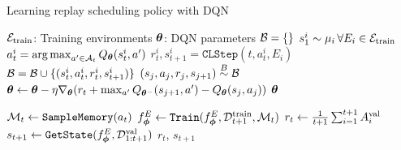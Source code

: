 \begin{algorithm}[t]
	\caption{Learning replay scheduling policy with DQN}
	\label{alg:learning_replay_scheduling_policy_with_dqn}
	\begin{algorithmic}[1]
		\Require ${\mathcal{E}}_{{\text{train}}}$: Training environments
		\Require ${\bm{\theta}}$: DQN parameters
		\State ${\mathcal{B}} = \{\}$ 
		\State $s_1^{i} \sim \mu_i \, \forall E_i \in {\mathcal{E}}_{{\text{train}}}$ 
		\State $a_t^{i} = \operatorname*{arg\,max}_{a' \in {\mathcal{A}}_t} Q_{{\bm{\theta}}}(s_t^{i}, a')$ 
		\State $r_t^{i}, s_{t+1}^{i} = \texttt{CLStep}(t, a_t^{i}, E_i)$
		\State ${\mathcal{B}} = {\mathcal{B}} \cup \{(s_{t}^{i}, a_{t}^{i}, r_{t}^{i}, s_{t+1}^{i})\}$ 
		\State $(s_j, a_j, r_j, s_{j+1}) \stackrel{B}{\sim} {\mathcal{B}}$ 					
		\State ${\bm{\theta}} \leftarrow {\bm{\theta}} - \eta \nabla_{{\bm{\theta}}} (r_t + \max_{a'} Q_{{\bm{\theta}}^{-}}(s_{j+1}, a') - Q_{{\bm{\theta}}}(s_j, a_j))$ 
		\EndFor
		\EndFor 
		\EndFor
		\State \Return ${\bm{\theta}}$ 
		
		\Statex
		
		\State ${\mathcal{M}}_t \leftarrow \texttt{SampleMemory}(a_t)$ 
		\State $f_{{\bm{\phi}}}^{E} \leftarrow \texttt{Train}(f_{{\bm{\phi}}}^{E}, {\mathcal{D}}_{t+1}^{{\text{train}}}, {\mathcal{M}}_t)$ 
		\State $r_t \leftarrow \frac{1}{t+1} \sum_{i=1}^{t+1} A_{i}^{{\text{val}}}$ 
		\State $s_{t+1} \leftarrow \texttt{GetState}(f_{{\bm{\phi}}}^{E}, {\mathcal{D}}_{1:t+1}^{{\text{val}}})$ 
		\State \Return $r_t$, $s_{t+1}$ 
		\EndFunction
	\end{algorithmic}
\end{algorithm}


